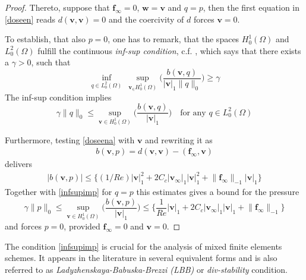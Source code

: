 \documentclass[a4paper,10pt,BCOR=15mm]{scrbook}
\providecommand{\abs}[1]{\lvert#1\rvert}
\providecommand{\norm}[1]{\lVert#1 \rVert}
\begin{document}
\begin{proof}
Thereto, suppose that $\mathbf f_\infty=0$, $\mathbf w = \mathbf v$ and $q=p$, then the first equation in \eqref{doseen} reads $d(\mathbf v,\mathbf v) = 0$ and the coercivity of $d$ forces $\mathbf v=0$.

To establish, that also $p=0$, one has to remark, that the spaces $H_0 ^1(\Omega) $ and $L_0^2(\Omega)$ fulfill the continuous \textit{inf-sup condition}, c.f. \cite[pp. 241-242]{bresco}, which says that there exists a $\gamma > 0$, such that
\begin{equation*}
 \inf_{q \in  L_0^2(\Omega)} ~ \sup_{\mathbf v_ \in H_0 ^1(\Omega) } \biggl ( \frac{b(\mathbf v, q)}{\abs{\mathbf v}_1 \norm{q}_0} \biggr ) \geq \gamma
\end{equation*}
The inf-sup condition implies
\begin{equation}\label{infsupimp}
\gamma \norm{q}_0 \leq \sup_{\mathbf v \in H_0 ^1(\Omega) } \biggl ( \frac{b(\mathbf v, q)}{\abs{\mathbf v}_1 } \biggr ) \quad \text{for any } q \in L_0^2(\Omega)
\end{equation}


Furthermore, testing \eqref{doseena} with $\mathbf v$ and rewriting it as
\begin{align*}
 b(\mathbf v,p) = d(\mathbf v,\mathbf v) - (\mathbf f_\infty,\mathbf v) 
\end{align*}
delivers
\begin{align*}
 |b(\mathbf v,p)| \leq \bigl\{ (1/Re)\abs{\mathbf v}_1^2 +2C_c\abs{\mathbf v_\infty}_1\abs{\mathbf v}_1^2+\norm{\mathbf f_\infty}_{-1}\abs{\mathbf v}_1 \bigr\}
\end{align*}
Together with \eqref{infsupimp} for $q=p$ this estimates gives a bound for the pressure
\begin{equation*}
\gamma \norm{p}_0 \leq \sup_{\mathbf v \in H_0 ^1(\Omega) } \biggl ( \frac{b(\mathbf v, p)}{\abs{\mathbf v}_1 } \biggr ) \leq \biggl \{\frac{1}{Re}\abs{\mathbf v}_1 +2C_c\abs{\mathbf v_\infty}_1\abs{\mathbf v}_1+\norm{\mathbf f_\infty}_{-1}\biggr\}
\end{equation*}
and forces $p=0$, provided $\mathbf f_\infty = 0$ and $\mathbf v=0$.
\end{proof}

\begin{rem}
 The condition \eqref{infsupimp} is crucial for the analysis of mixed finite elements schemes. It appears in the literature in several equivalent forms and is also referred to as \textit{Ladyzhenskaya-Babuska-Brezzi (LBB)} or \textit{div-stability} condition. 
\end{rem}
\end{document}
